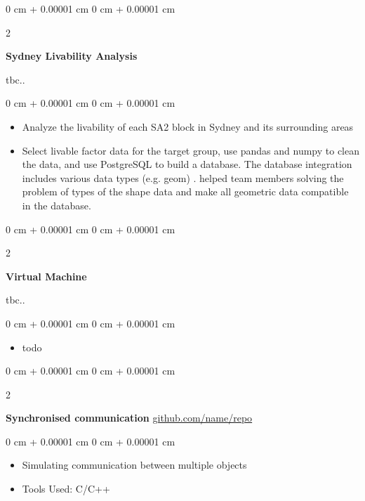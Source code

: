 \documentclass[10pt, letterpaper]{article}
\newenvironment{highlights}{
    \begin{itemize}[
        topsep=0.10 cm,
        parsep=0.10 cm,
        partopsep=0pt,
        itemsep=0pt,
        leftmargin=0 cm + 10pt
    ]
}{
    \end{itemize}
} %
\newenvironment{onecolentry}{
    \begin{adjustwidth}{
        0 cm + 0.00001 cm
    }{
        0 cm + 0.00001 cm
    }
}{
    \end{adjustwidth}
} %
\newenvironment{twocolentry}[2][]{
    \onecolentry
    \def\secondColumn{#2}
    \setcolumnwidth{\fill, 4.5 cm}
    \begin{paracol}{2}
}{
    \switchcolumn \raggedleft \secondColumn
    \end{paracol}
    \endonecolentry
} %
\begin{document}
        \begin{twocolentry}{tbc..}
            \textbf{Sydney Livability Analysis}
        \end{twocolentry}
        \vspace{0.10 cm}
        \begin{onecolentry}
            \begin{highlights}
                \item Analyze the livability of each SA2 block in Sydney and its surrounding areas
                \item Select livable factor data for the target group, use pandas and numpy to clean the data, and use PostgreSQL to build a database. The database integration includes various data types (e.g. geom) .  helped team members solving the problem of types of the shape data and make all geometric data compatible in the database.
            \end{highlights}
        \end{onecolentry}
        \vspace{0.2 cm}

        \begin{twocolentry}{tbc..}
            \textbf{Virtual Machine}
        \end{twocolentry}
        \vspace{0.10 cm}
        \begin{onecolentry}
            \begin{highlights}
                \item todo
            \end{highlights}
        \end{onecolentry}
        \vspace{0.2 cm}

        \begin{twocolentry}{
            \href{https://github.com/sinaatalay/rendercv}{github.com/name/repo}
        }
        \textbf{Synchronised communication}\end{twocolentry}
        \vspace{0.10 cm}
        \begin{onecolentry}
            \begin{highlights}
                \item Simulating communication between multiple objects
                \item Tools Used: C/C++
            \end{highlights}
        \end{onecolentry}
        \vspace{0.2 cm}
\end{document}
